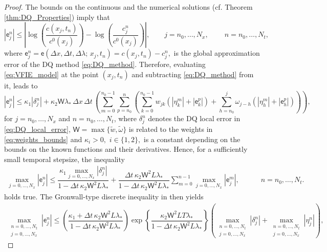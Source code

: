 \documentclass[a4paper, UKenglish, numberwithinsect, thm-restate]{tgdk-v2021}
\begin{document}
\begin{proof}
    The bounds on the continuous and the numerical solutions (cf. Theorem \ref{thm:DQ_Properties}) imply that 
    \begin{equation*}
        \left|\mathsf{e}_j^n\right|\leq \left| \log\left(\dfrac{c(x_j,t_n)}{c^0(x_j)}\right)-\log\left(\dfrac{c_j^n}{c^0(x_j)}\right) \right|, \qquad j=n_0,\dots, N_x, \qquad \ n=n_0,\dots, N_t,
    \end{equation*}
    where $\mathsf{e}_j^n=\mathsf{e}(\Delta x, \Delta t, \Delta \lambda; \,  x_j,t_n)=c(x_j,t_n)-c_j^n,$ is the global approximation error of the DQ method \eqref{eq:DQ_method}. Therefore, evaluating \eqref{eq:VFIE_model} at the point $(x_j,t_n)$ and subtracting \eqref{eq:DQ_method} from it, leads to 
    \begin{equation*}
            \left|\mathsf{e}_j^n\right|\leq \kappa_1  \left|\delta_j^n\right| + \kappa_2  \mathsf{W} \lambda_* \, \Delta x \, \Delta t \,  \left(\sum_{m=0}^{n_0-1}\sum_{p=n_0}^{n}  \left(\sum_{k=0}^{n_0-1}  w_{jk}(|\eta_k^m|+|\mathsf{e}_k^p|)+  \sum_{h=n_0}^{j}  \omega_{j-h}(|\eta_h^m|+|\mathsf{e}_h^p|)\right)  \right),
    \end{equation*}
    for $j=n_0,\dots, N_x$ and $n=n_0,\dots, N_t$, where $\delta_j^n$ denotes the DQ local error in \eqref{eq:DQ_local_error}, $\mathsf{W}=\max\{\tilde{w}, \tilde{\omega}\}$ is related to the weights in \eqref{eq:weights_bounds} and $\kappa_i>0,$ $i\in\{1,2\},$ is a constant depending on the bounds on the known functions and their derivatives. Hence, for a sufficiently small temporal stepsize, the inequality
    \begin{equation*}
        \begin{split}
            \max_{j=0,\dots,N_x}|\mathsf{e}_j^n|\leq \dfrac{\kappa_1 \max_{j=0,\dots,N_x}|\delta_j ^n|}{1-\Delta t \, \kappa_2 \mathsf{W}^2 L \lambda_*}+ \dfrac{\Delta t \, \kappa_2 \mathsf{W}^2 L \lambda_*}{1-\Delta t \, \kappa_2 \mathsf{W}^2 L \lambda_*} \sum_{m=0}^{n-1} \max_{j=0,\dots,N_x}|\mathsf{e}_j^m|, \qquad \quad n=n_0,\dots, N_t.
        \end{split}
    \end{equation*}
    holds true. The Gronwall-type discrete inequality in \cite[Theorem 7.1]{Linz_1985} then yields
    \begin{equation*}
        \begin{split}
            \max_{\substack{n=0,\dots, N_t \\ j=0,\dots, N_x}}|\mathsf{e}_j^n|\leq \left(\dfrac{\kappa_1 + \Delta t \, \kappa_2 \mathsf{W}^2 L \lambda_*}{1-\Delta t \, \kappa_2 \mathsf{W}^2 L \lambda_*}  \right)\exp\left\{\dfrac{\kappa_2 \mathsf{W}^2 LT\lambda_*}{1-\Delta t \, \kappa_2 \mathsf{W}^2 L \lambda_*}\right\}\left(\max_{\substack{n=0,\dots, N_t \\ j=0,\dots, N_x}}|\delta_j ^n|+\max_{\substack{n=0,\dots, N_t \\ j=0,\dots, N_x}}|\eta_j ^n|\right),

\end{split}
\end{equation*}
\end{proof}
\end{document}
